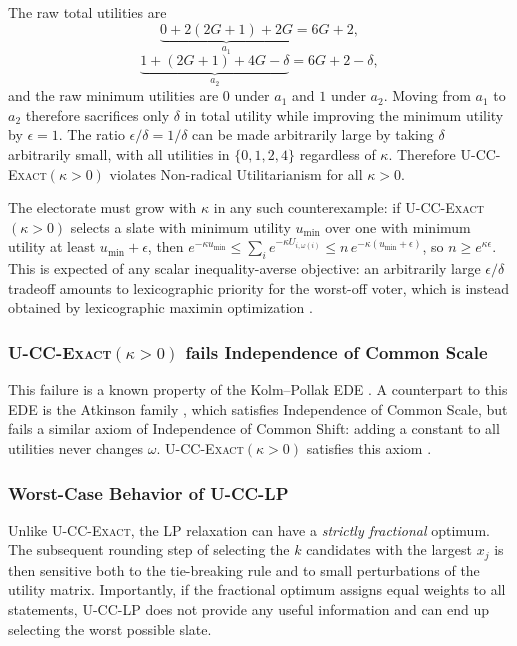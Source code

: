 \documentclass[letterpaper]{article} %
\newcommand{\Exact}{\textsc{U-CC-Exact}}
\newcommand{\ExactP}{\textsc{U-CC-Exact}$(\kappa>0)$}
\newcommand{\LP}{\textsc{U-CC-LP}}
\begin{document}
The raw total utilities are
\[
\underbrace{0+2(2G+1)+2G}_{a_1}=6G+2,
\]
\[
\underbrace{1+(2G+1)+4G-\delta}_{a_2}=6G+2-\delta,
\]
and the raw minimum utilities are \(0\) under \(a_1\) and \(1\) under \(a_2\).
Moving from \(a_1\) to \(a_2\) therefore sacrifices only \(\delta\) in total utility while improving the minimum utility by \(\epsilon=1\).
The ratio \(\epsilon/\delta=1/\delta\) can be made arbitrarily large by taking \(\delta\) arbitrarily small, with all utilities in \(\{0,1,2,4\}\) regardless of \(\kappa\).
Therefore \ExactP{} violates Non-radical Utilitarianism for all \(\kappa>0\).

The electorate must grow with \(\kappa\) in any such counterexample: if \ExactP{} selects a slate with minimum utility \(u_{\mathrm{min}}\) over one with minimum utility at least \(u_{\mathrm{min}}+\epsilon\), then \(e^{-\kappa u_{\mathrm{min}}}\le\sum_i e^{-\kappa U_{i,\omega(i)}}\le n\,e^{-\kappa(u_{\mathrm{min}}+\epsilon)}\), so \(n\ge e^{\kappa\epsilon}\).
This is expected of any scalar inequality-averse objective: an arbitrarily large \(\epsilon/\delta\) tradeoff amounts to lexicographic priority for the worst-off voter, which is instead obtained by lexicographic maximin optimization \citep{luss-1999, kostreva-ogryczak-wierzbicki-2004}.

\subsubsection{\ExactP{} fails Independence of Common Scale}
\label{app:exactp-ics}

This failure is a known property of the Kolm--Pollak EDE \citep{kolm-1976, blackorby-donaldson-1980}.
A counterpart to this EDE is the Atkinson family \citep{atkinson-1970}, which satisfies Independence of Common Scale, but fails a similar axiom of Independence of Common Shift: adding a constant to all utilities never changes $\omega$.
\ExactP{} satisfies this axiom \citep{blackorby-donaldson-1980}.

\subsubsection{Worst-Case Behavior of \LP{}}
\label{app:lp-worst}

Unlike \Exact{}, the LP relaxation can have a \emph{strictly fractional} optimum.
The subsequent rounding step of selecting the $k$ candidates with the largest $x_j$ is then sensitive both to the tie-breaking rule and to small perturbations of the utility matrix.
Importantly, if the fractional optimum assigns equal weights to all statements, \LP{} does not provide any useful information and can end up selecting the worst possible slate.
\end{document}
